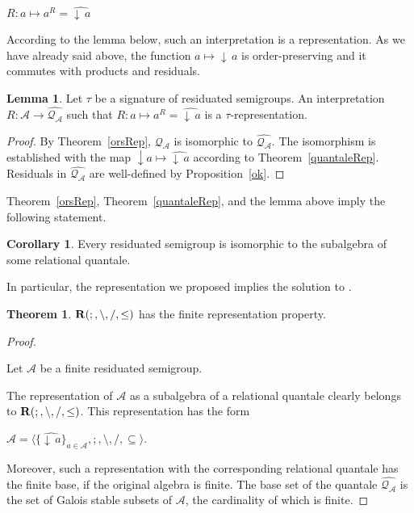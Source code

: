 \documentclass[a4paper]{article}
\theoremstyle{definition}
\theoremstyle{theorem}
\newtheorem{theorem}{Theorem}
\theoremstyle{proposition}
\theoremstyle{lemma}
\newtheorem{lemma}{Lemma}
\theoremstyle{ex}
\theoremstyle{corollary}
\newtheorem{corollary}{Corollary}
\theoremstyle{claim}
\newcommand{\down}[1]{\ensuremath{{\downarrow}\,#1}}
\begin{document}
\begin{center}
  $R : a \mapsto a^{R} = \widehat{\down{a}}$
\end{center}

According to the lemma below, such an interpretation is a representation. As we have already said above, the function $a \mapsto \down{a}$ is order-preserving and it commutes with products and residuals.

\begin{lemma}
  Let $\tau$ be a signature of residuated semigroups. An interpretation $R : \mathcal{A} \to \widehat{\mathcal{Q}_{\mathcal{A}}}$ such that $R : a \mapsto a^{R} = \widehat{\down{a}}$ is a $\tau$-representation.
\end{lemma}

\begin{proof}
  By Theorem~\ref{orsRep}, $\mathcal{Q}_{\mathcal{A}}$ is isomorphic to $\widehat{\mathcal{Q}_{\mathcal{A}}}$. The isomorphism is established with the map $\downarrow{a} \mapsto \widehat{\down{a}}$ according to Theorem~\ref{quantaleRep}.
  Residuals in $\widehat{\mathcal{Q}_{\mathcal{A}}}$ are well-defined by Proposition~\ref{ok}.
\end{proof}

Theorem~\ref{orsRep}, Theorem~\ref{quantaleRep}, and the lemma above imply the following statement.
\begin{corollary} \label{orsRep2}
  Every residuated semigroup is isomorphic to the subalgebra of some relational quantale.
\end{corollary}

In particular, the representation we proposed implies the solution to \cite[Problem 19.17]{hirsch2002relation}.
\begin{theorem} \label{solution}
  ${\bf R}(;, \setminus, /, \leq)$ has the finite representation property.
\end{theorem}

\begin{proof}
  $ $

  Let $\mathcal{A}$ be a finite residuated semigroup.

  The representation of $\mathcal{A}$ as a subalgebra of a relational quantale clearly belongs to ${\bf R}(;, \setminus, /, \leq)$. This representation has the form

\begin{center}
  $\widehat{\mathcal{A}} = \langle \{ \widehat{\down{a}} \}_{a \in \mathcal{A}}, ;, \setminus, /, \subseteq \rangle$.
\end{center}

  Moreover, such a representation with the corresponding relational quantale has the finite base, if the original algebra is finite. The base set of the quantale $\widehat{\mathcal{Q}_{\mathcal{A}}}$ is the set of Galois stable subsets of $\mathcal{A}$, the cardinality of which is finite.
\end{proof}
\end{document}
